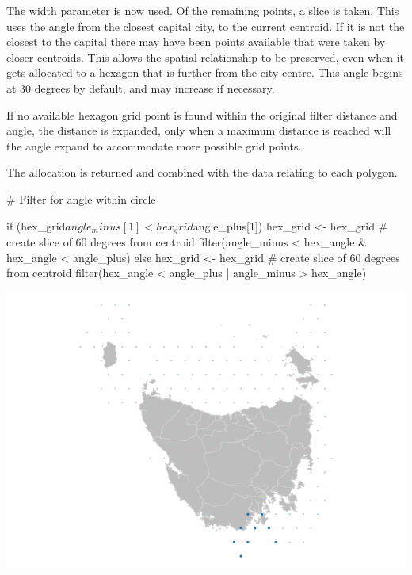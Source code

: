 The width parameter is now used. Of the remaining points, a slice is
taken. This uses the angle from the closest capital city, to the current
centroid. If it is not the closest to the capital there may have been
points available that were taken by closer centroids. This allows the
spatial relationship to be preserved, even when it gets allocated to a
hexagon that is further from the city centre. This angle begins at 30
degrees by default, and may increase if necessary.

If no available hexagon grid point is found within the original filter
distance and angle, the distance is expanded, only when a maximum
distance is reached will the angle expand to accommodate more possible
grid points.

The allocation is returned and combined with the data relating to each
polygon.

\begin{Schunk}
\begin{Sinput}
# Filter for angle within circle

        if (hex_grid$angle_minus[1] < hex_grid$angle_plus[1]) {
            hex_grid <- hex_grid %
                # create slice of 60 degrees from centroid
                filter(angle_minus < hex_angle & hex_angle < angle_plus)
        } else {
            hex_grid <- hex_grid %
                # create slice of 60 degrees from centroid
                filter(hex_angle < angle_plus | angle_minus > hex_angle)
        }
\end{Sinput}
\end{Schunk}

\begin{Schunk}

\includegraphics{algorithmRjournal_files/figure-latex/plot_slice-1} \end{Schunk}


